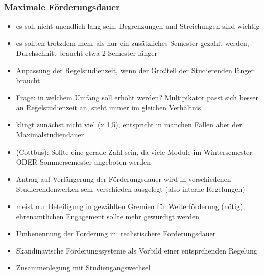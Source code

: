     \subsubsection{Maximale Förderungsdauer}
      \begin{itemize}
        \item es soll nicht unendlich lang sein, Begrenzungen und Streichungen sind wichtig
        \item es sollten trotzdem mehr als nur ein zusätzliches Semester gezahlt werden, Durchschnitt braucht etwa 2 Semester länger
        \item Anpassung der Regelstudienzeit, wenn der Großteil der Studierenden länger braucht
        \item Frage: in welchem Umfang soll erhöht werden? Multipikator passt sich besser an Regelstudienzeit an, steht immer im gleichen Verhältnis
        \item klingt zunächst nicht viel (x 1,5), entspricht in manchen Fällen aber der Maximalstudiendauer
        \item (Cottbus): Sollte eine gerade Zahl sein, da viele Module im Wintersemester ODER Sommersemester angeboten werden
        \item Antrag auf Verlängerung der Förderungsdauer wird in verschiedenen Studierendenwerken sehr verschieden ausgelegt (also interne Regelungen)
        \item meist nur Beteiligung in gewählten Gremien für Weiterförderung (nötig), ehrenamtlichen Engagement sollte mehr gewürdigt werden
        \item Umbenennung der Forderung in: realistischere Förderungsdauer
        \item Skandinavische Förderungssysteme als Vorbild einer entsprchenden Regelung
        \item Zusammenlegung mit Studiengangswechsel
      \end{itemize}

